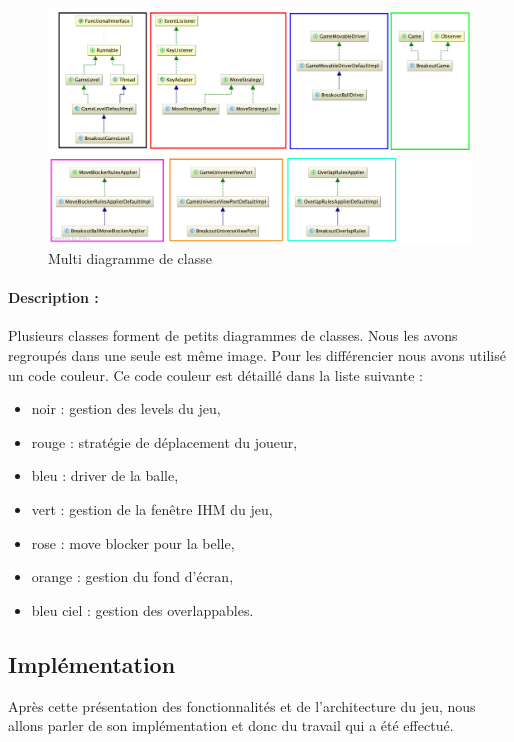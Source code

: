 \documentclass[a4paper,10pt]{article}
\begin{document}
 		\FloatBarrier
 		\begin{figure}[!h]
     		\begin{center}
 	  	  	\includegraphics[scale=0.2]{images/whiteSeveralDiagram.jpg}
           	\caption{Multi diagramme de classe}
     		\end{center}
 		\end{figure}
 		\FloatBarrier
 		\paragraph{Description :}
 		Plusieurs classes forment de petits diagrammes de classes. Nous les avons regroupés dans une seule est même image.
 		Pour les différencier
 		nous avons utilisé un code couleur. Ce code couleur est détaillé dans la liste suivante : \\
 		\begin{itemize}
 		\item noir : gestion des levels du jeu,
 		\item rouge : stratégie de déplacement du joueur,
 		\item bleu : driver de la balle,
 		\item vert : gestion de la fenêtre IHM du jeu,
 		\item rose : move blocker pour la belle,
 		\item orange : gestion du fond d'écran,
 		\item bleu ciel : gestion des overlappables.
 		\end{itemize}


\subsection{Implémentation}
    Après cette présentation des fonctionnalités et de l'architecture du jeu, nous allons
    parler de son implémentation et donc du travail qui a été effectué.
\end{document}
